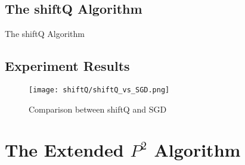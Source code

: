 

\subsection{The shiftQ Algorithm}
\begin{algorithm}
    \caption{The shiftQ Algorithm}\label{alg:multi_shiftQ}
        \begin{algorithmic}[1]
        \end{algorithmic}
\end{algorithm}
\subsection{Experiment Results}

\begin{figure*}[h!]
	\texttt{[image: shiftQ/shiftQ\_vs\_SGD.png]}
	\caption{Comparison between shiftQ and SGD}
\end{figure*}


\section{The Extended $P^2$ Algorithm}
\label{sec: multi_{p2}}

